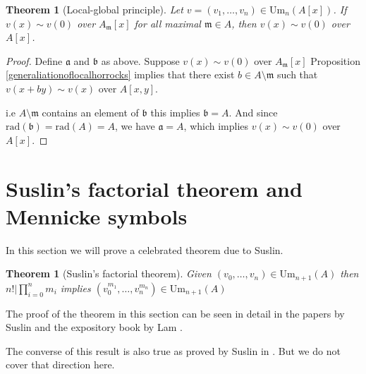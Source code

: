 \documentclass[12pt]{report}
\numberwithin{equation}{section}
\newcounter{dummy} \numberwithin{dummy}{section}
\newtheorem{theorem}[dummy]{Theorem}
\begin{document}
	\begin{theorem}[Local-global principle]\label{localglobalprinciple}
		Let $v = (v_1, \dots, v_n) \in \mathrm{Um}_n(A[x])$. If $v(x) \sim v(0)$ over $A_{\mathfrak{m}}[x]$ for all maximal $\mathfrak{m} \in A$, then $v(x) \sim v(0)$ over $A[x]$.
	\end{theorem}
	
	\begin{proof}
		Define $\mathfrak{a}$ and $\mathfrak{b}$ as above. Suppose $v(x) \sim v(0)$ over $A_\mathfrak{m}[x]$ Proposition \ref{generaliationoflocalhorrocks} implies that there exist $b \in A \setminus \mathfrak m$ such that $v(x+by) \sim v(x)$ over $A[x,y]$.
		
		i.e $A\setminus \mathfrak{m}$ contains an element of $\mathfrak{b}$ this implies $\mathfrak{b} = A$.  And since $\mathrm{rad}(\mathfrak{b})= \mathrm{rad}(A)=A$, we have $\mathfrak{a} = A$, which implies $v(x) \sim v(0)$ over $A[x]$.
	\end{proof}
		
		\section{Suslin's factorial theorem and Mennicke symbols}	
		In this section we will prove a celebrated theorem due to Suslin. \begin{theorem}[Suslin's factorial theorem]\label{suslinfactorial}
			Given $(v_0,\dots,v_n) \in \mathrm{Um}_{n+1}(A)$ then$n! | \prod_{i=0}^n m_i$ implies $(v_0^{m_1}, \dots, v_n^{m_n}) \in \mathrm{Um}_{n+1}(A)$ 
		\end{theorem}
			The proof of the theorem in this section can be seen in detail in the papers by Suslin \cite{suslin1977} and the expository book by Lam \cite{lam2010serre}. 
			
			The converse of this result is also true as proved by Suslin in \cite{suslin1982}. But we do not cover that direction here.
			
\end{document}
